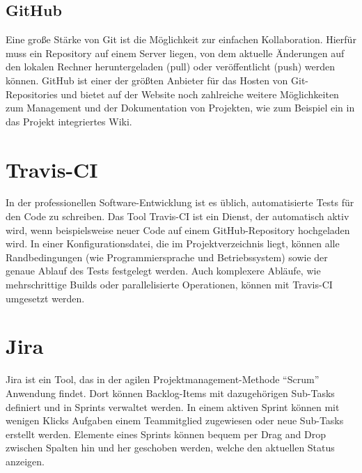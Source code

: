 \subsection{GitHub}
Eine große Stärke von Git ist die Möglichkeit zur einfachen Kollaboration. Hierfür muss ein Repository auf einem Server liegen, von dem aktuelle Änderungen auf den lokalen Rechner heruntergeladen (pull) oder veröffentlicht (push) werden können. GitHub ist einer der größten Anbieter für das Hosten von Git-Repositories und bietet auf der Website noch zahlreiche weitere Möglichkeiten zum Management und der Dokumentation von Projekten, wie zum Beispiel ein in das Projekt integriertes Wiki.

\section{Travis-CI}
In der professionellen Software-Entwicklung ist es üblich, automatisierte Tests für den Code zu schreiben. Das Tool Travis-CI ist ein Dienst, der automatisch aktiv wird, wenn beispielsweise neuer Code auf einem GitHub-Repository hochgeladen wird. In einer Konfigurationsdatei, die im Projektverzeichnis liegt, können alle Randbedingungen (wie Programmiersprache und Betriebssystem) sowie der genaue Ablauf des Tests festgelegt werden. Auch komplexere Abläufe, wie mehrschrittige Builds oder parallelisierte Operationen, können mit Travis-CI umgesetzt werden.

\section{Jira}
Jira ist ein Tool, das in der agilen Projektmanagement-Methode \enquote{Scrum} Anwendung findet. Dort können Backlog-Items mit dazugehörigen Sub-Tasks definiert und in Sprints verwaltet werden. In einem aktiven Sprint können mit wenigen Klicks Aufgaben einem Teammitglied zugewiesen oder neue Sub-Tasks erstellt werden. Elemente eines Sprints können bequem per Drag and Drop zwischen Spalten hin und her geschoben werden, welche den aktuellen Status anzeigen.